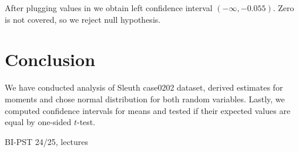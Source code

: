 \documentclass[12pt,a4paper]{article} %
\begin{document}
After plugging values in we obtain left confidence interval $(-\infty, -0.055)$. Zero is not covered, so we reject null hypothesis.


\section{Conclusion}
We have conducted analysis of Sleuth case0202 dataset, derived estimates for moments and chose normal distribution for both random variables. Lastly, we computed confidence intervals for means and tested if their expected values are equal by one-sided $t$-test.


\begin{thebibliography}{99}
 BI-PST 24/25, lectures
\end{thebibliography}
\end{document}
